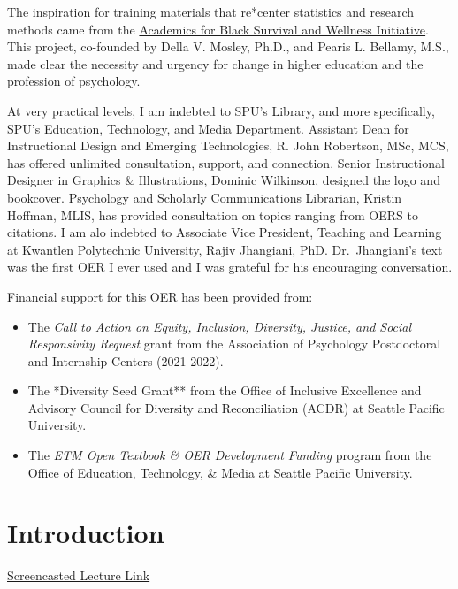 \documentclass[
  english,
]{book}
\providecommand{\tightlist}{%
  \setlength{\itemsep}{0pt}\setlength{\parskip}{0pt}}
\begin{document}
The inspiration for training materials that re*center statistics and research methods came from the \href{https://www.academics4blacklives.com/}{Academics for Black Survival and Wellness Initiative}. This project, co-founded by Della V. Mosley, Ph.D., and Pearis L. Bellamy, M.S., made clear the necessity and urgency for change in higher education and the profession of psychology.

At very practical levels, I am indebted to SPU's Library, and more specifically, SPU's Education, Technology, and Media Department. Assistant Dean for Instructional Design and Emerging Technologies, R. John Robertson, MSc, MCS, has offered unlimited consultation, support, and connection. Senior Instructional Designer in Graphics \& Illustrations, Dominic Wilkinson, designed the logo and bookcover. Psychology and Scholarly Communications Librarian, Kristin Hoffman, MLIS, has provided consultation on topics ranging from OERS to citations. I am alo indebted to Associate Vice President, Teaching and Learning at Kwantlen Polytechnic University, Rajiv Jhangiani, PhD. Dr.~Jhangiani's text \citeyearpar{jhangiani_research_2019} was the first OER I ever used and I was grateful for his encouraging conversation.

Financial support for this OER has been provided from:

\begin{itemize}
\tightlist
\item
  The \emph{Call to Action on Equity, Inclusion, Diversity, Justice, and Social Responsivity
  Request} grant from the Association of Psychology Postdoctoral and Internship Centers (2021-2022).
\item
  The *Diversity Seed Grant** from the Office of Inclusive Excellence and Advisory Council for Diversity and Reconciliation (ACDR) at Seattle Pacific University.
\item
  The \emph{ETM Open Textbook \& OER Development Funding} program from the Office of Education, Technology, \& Media at Seattle Pacific University.
\end{itemize}

\hypertarget{ReCintro}{%
\chapter{Introduction}\label{ReCintro}}

\href{https://spu.hosted.panopto.com/Panopto/Pages/Viewer.aspx?pid=cc9b7c0d-e5c3-4e4e-a469-acf7013ee761}{Screencasted Lecture Link}
\end{document}
